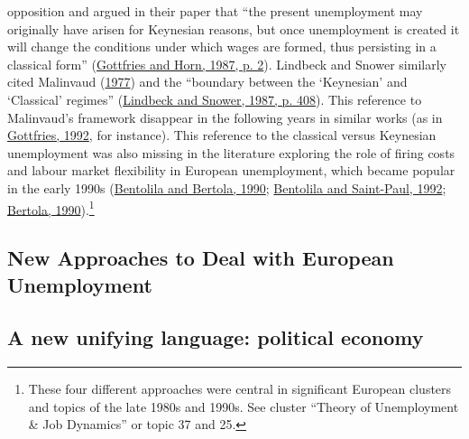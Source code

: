 \documentclass[
  12pt,
  onecolumn]{article}
\begin{document}
opposition and argued in their paper that ``the present unemployment may
originally have arisen for Keynesian reasons, but once unemployment is
created it will change the conditions under which wages are formed, thus
persisting in a classical form''
(\protect\hyperlink{ref-gottfries1987}{Gottfries and Horn, 1987, p. 2}).
Lindbeck and Snower similarly cited Malinvaud
(\protect\hyperlink{ref-malinvaud1977}{1977}) and the ``boundary between
the `Keynesian' and `Classical' regimes''
(\protect\hyperlink{ref-lindbeck1987a}{Lindbeck and Snower, 1987, p.
408}). This reference to Malinvaud's framework disappear in the
following years in similar works (as in
\protect\hyperlink{ref-gottfries1992}{Gottfries, 1992}, for instance).
This reference to the classical versus Keynesian unemployment was also
missing in the literature exploring the role of firing costs and labour
market flexibility in European unemployment, which became popular in the
early 1990s (\protect\hyperlink{ref-bentolila1990}{Bentolila and
Bertola, 1990}; \protect\hyperlink{ref-bentolila1992a}{Bentolila and
Saint-Paul, 1992}; \protect\hyperlink{ref-bertola1990a}{Bertola,
1990}).\footnote{These four different approaches were central in
  significant European clusters and topics of the late 1980s and 1990s.
  See cluster ``Theory of Unemployment \& Job Dynamics'' or topic 37 and
  25.}

\hypertarget{new-approaches-to-deal-with-european-unemployment}{%
\subsection{New Approaches to Deal with European
Unemployment}\label{new-approaches-to-deal-with-european-unemployment}}

\hypertarget{political-economics}{%
\subsection{A new unifying language: political
economy}\label{political-economics}}
\end{document}
